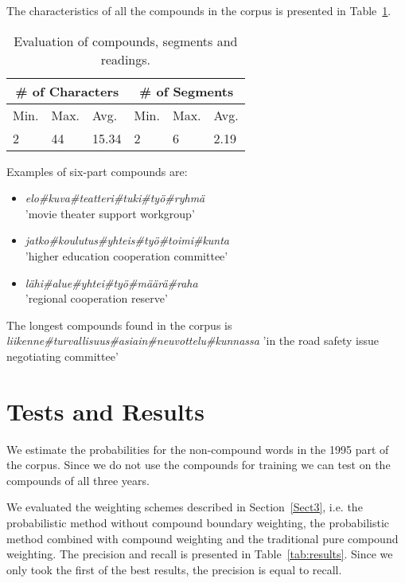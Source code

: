 \documentclass[11pt]{article}
\begin{document}
The characteristics of all the compounds in the corpus is presented in
Table~\ref{tab:compounds}.

\begin{table}[htb!]
  \begin{small}
    \begin{tabular}{|l|l|l|l|l|l|}
      \hline
      \multicolumn{3}{c}{\# of Characters} & \multicolumn{3}{c}{\# of Segments} \\
      \hline 
      Min. &  Max. &  Avg. & Min. & Max. & Avg. \\
      \hline 
      2 & 44 & 15.34 & 2 & 6 & 2.19 \\
      \hline
    \end{tabular}
    \caption{Evaluation of compounds, segments and readings.
    }\label{tab:compounds}
  \end{small}
\end{table}

Examples of six-part compounds are:
\begin{itemize}
\item \emph{elo\#kuva\#teat\-teri\#tuki\#työ\#ryhmä} \\
'movie theater support workgroup' 
\item \emph{jatko\#koulu\-tus\#yhteis\#työ\#toimi\#kunta} \\
'higher education cooperation committee'
\item \emph{lähi\#alue\#yhtei\#työ\#määrä\#raha} \\
'regional cooperation reserve'
\end{itemize}

The longest compounds found in the corpus is
\emph{liiken\-ne\#turval\-lisuus\#asiain\#neuvot\-telu\#kunnassa} 'in the road
safety issue negotiating committee'

\section{Tests and  Results}
\label{Sect5}

We estimate the probabilities for the non-compound words in the 1995
part of the corpus. Since we do not use the compounds for training we
can test on the compounds of all three years.

We evaluated the weighting schemes described in Section~\ref{Sect3},
i.e. the probabilistic method without compound boundary weighting, the
probabilistic method combined with compound weighting and the
traditional pure compound weighting. The precision and recall is
presented in Table~\ref{tab:results}. Since we only took the first of
the best results, the precision is equal to recall.
\end{document}
